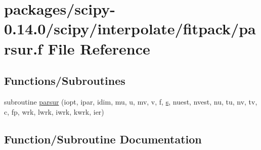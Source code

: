 \hypertarget{parsur_8f}{}\section{packages/scipy-\/0.14.0/scipy/interpolate/fitpack/parsur.f File Reference}
\label{parsur_8f}
\subsection*{Functions/\+Subroutines}
\begin{DoxyCompactItemize}
\item 
subroutine \hyperlink{parsur_8f_aae2422842511d715d11a112bfb3eae9c}{parsur} (iopt, ipar, idim, mu, u, mv, v, f, \hyperlink{indexexpr_8h_ae024b0db549122b44c349ae28ec990dc}{s}, nuest, nvest, nu, tu, nv, tv, c, fp, wrk, lwrk, iwrk, kwrk, ier)
\end{DoxyCompactItemize}


\subsection{Function/\+Subroutine Documentation}
\hypertarget{parsur_8f_aae2422842511d715d11a112bfb3eae9c}{}
